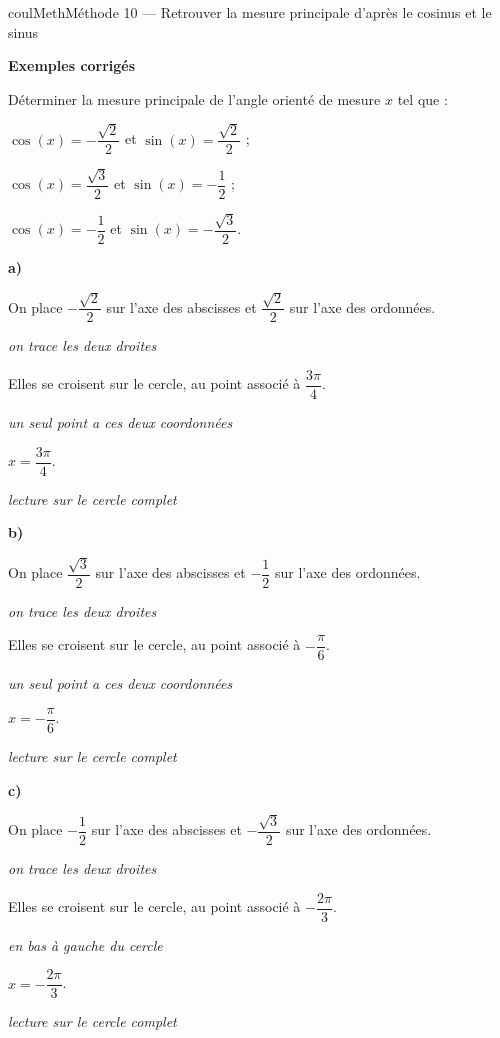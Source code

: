 \documentclass[11pt,a4paper]{article}
\makeatletter
\newcounter{lycee@signet}
\newcommand{\signet}[3][]{\stepcounter{lycee@signet}%
  \edef\lycee@dest{\if\relax\detokenize{#1}\relax
    signet.\arabic{lycee@signet}\else#1\fi}%
  \hypertarget{\lycee@dest}{}\bookmark[level=#2,dest=\lycee@dest]{#3}}
\newcommand{\res}[1]{#1}
\newcounter{methode}
\newenvironment{methodebox}[1][Méthode]{\stepcounter{methode}%
  \begin{boitecours}[phantom={\signet[methode-\arabic{methode}]{2}{#1}}]{coulMeth}{#1}}%
  {\end{boitecours}}
\newcommand{\etape}[1]{\par\smallskip\textbf{\color{coulMeth}#1}\par\nobreak\smallskip}
\newcommand{\explique}[2]{\par\smallskip\noindent
  \begin{minipage}[t]{0.57\linewidth}\raggedright #1\end{minipage}\hfill
  \begin{minipage}[t]{0.40\linewidth}\raggedright\leavevmode
    {\small\itshape\color{black!60}#2}\end{minipage}\par}
\newcommand{\cas}[1]{\par\smallskip\noindent\textbf{\color{coulExo}#1}\vadjust{\nobreak}}
\newenvironment{correction}{\par}{\par}
\newcommand{\etapeexemples}{\etape{Exemples corrigés}}
\makeatother
\begin{document}
\begin{methodebox}[Méthode 10 --- Retrouver la mesure principale d'après le cosinus et le sinus]
\etapeexemples
Déterminer la mesure principale de l'angle orienté de mesure $x$ tel que :
\begin{questions}[label=\alph*)]
  \item $\cos(x)=-\dfrac{\sqrt{2}}{2}$ et $\sin(x)=\dfrac{\sqrt{2}}{2}$ ;
  \item $\cos(x)=\dfrac{\sqrt{3}}{2}$ et $\sin(x)=-\dfrac{1}{2}$ ;
  \item $\cos(x)=-\dfrac{1}{2}$ et $\sin(x)=-\dfrac{\sqrt{3}}{2}$.
\end{questions}
\begin{correction}
\cas{a)}\par\nopagebreak
\begin{minipage}[c]{0.68\linewidth}\raggedright
\explique{On place $-\dfrac{\sqrt{2}}{2}$ sur l'axe des abscisses et $\dfrac{\sqrt{2}}{2}$ sur l'axe des ordonnées.}{on trace les deux droites}
\explique{Elles se croisent sur le cercle, au point associé à $\dfrac{3\pi}{4}$.}{un seul point a ces deux coordonnées}
\explique{$x=\res{\dfrac{3\pi}{4}}$.}{lecture sur le cercle complet}
\end{minipage}\hfill
\begin{minipage}[c]{0.28\linewidth}\centering
{}
\end{minipage}
\cas{b)}\par\nopagebreak
\begin{minipage}[c]{0.68\linewidth}\raggedright
\explique{On place $\dfrac{\sqrt{3}}{2}$ sur l'axe des abscisses et $-\dfrac{1}{2}$ sur l'axe des ordonnées.}{on trace les deux droites}
\explique{Elles se croisent sur le cercle, au point associé à $-\dfrac{\pi}{6}$.}{un seul point a ces deux coordonnées}
\explique{$x=\res{-\dfrac{\pi}{6}}$.}{lecture sur le cercle complet}
\end{minipage}\hfill
\begin{minipage}[c]{0.28\linewidth}\centering
{}
\end{minipage}
\cas{c)}\par\nopagebreak
\begin{minipage}[c]{0.68\linewidth}\raggedright
\explique{On place $-\dfrac{1}{2}$ sur l'axe des abscisses et $-\dfrac{\sqrt{3}}{2}$ sur l'axe des ordonnées.}{on trace les deux droites}
\explique{Elles se croisent sur le cercle, au point associé à $-\dfrac{2\pi}{3}$.}{en bas à gauche du cercle}
\explique{$x=\res{-\dfrac{2\pi}{3}}$.}{lecture sur le cercle complet}
\end{minipage}\hfill
\begin{minipage}[c]{0.28\linewidth}\centering
{}
\end{minipage}
\end{correction}


\end{methodebox}
\end{document}

